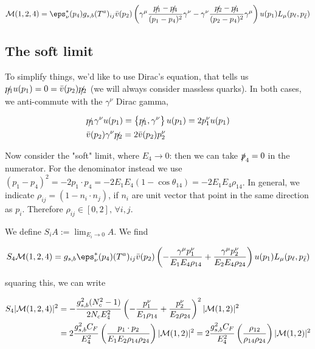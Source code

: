 \documentclass[11pt]{report}
\begin{document}
\begin{align}
    \label{eq:NLOme}
    \mathcal{M}(1, 2, 4) = \eps^*_\nu(p_4)g_{s, b}(T^a)_{ij}\bar{v}(p_2)\left( \gamma^\mu\frac{\slashed{p_1}-\slashed{p_4}}{(p_1-p_4)^2}\gamma^\nu - \gamma^\nu \frac{ \slashed{p_2}-\slashed{p_4}}{(p_2-p_4)^2}\gamma^\mu\right) u(p_1)L_\mu (p_\ell, p_{\bar{\ell}})
\end{align}

\subsection{The soft limit}

To simplify things, we'd like to use Dirac's equation, that tells us \(\slashed{p_1}u(p_1) = 0 = \bar{v}(p_2)\slashed{p_2}\) (we will always consider massless quarks). In both cases, we anti-commute with the \(\gamma^\nu\) Dirac gamma, 

\begin{align}
    &\slashed{p_1}\gamma^\nu u(p_1) = \left\{ \slashed{p_1}, \gamma^\nu \right\} u(p_1) = 2p_1^\nu u(p_1) \notag \\ 
    &\bar{v}(p_2)\gamma^\nu\slashed{p_2} = 2\bar{v}(p_2)p_2^\nu 
\end{align}

Now consider the "soft" limit, where \(E_4 \to 0\): then we can take \(\slashed{p}_4 = 0\) in the numerator. For the denominator instead we use \((p_1-p_4)^2 = -2p_1 \cdot p_4 = -2E_1 E_4 (1-\cos\theta_{14}) = -2E_1 E_4 \rho_{14}\). In general, we indicate \(\rho_{ij} = (1 - n_i \cdot n_j)\), if \(n_i\) are unit vector that point in the same direction as \(p_i\). Therefore \(\rho_{ij} \in [0, 2], \, \forall i, j\).   

We define \(S_i A := \lim_{E_i \to 0}A\). We find 

\begin{align}
    S_4 \mathcal{M}(1, 2, 4) = g_{s, b}\eps^*_\nu (p_4) (T^a)_{ij} \bar{v}(p_2)\left( -\frac{\gamma^\mu p_1^\nu}{E_1 E_4\rho_{14}}  + \frac{\gamma^\mu p_2^\nu}{E_2 E_4\rho_{24}}\right)u(p_1)L_\mu (p_\ell, p_{\bar{\ell}})
\end{align}

squaring this, we can write 

\begin{align}
    \label{eq:softDYfactorization}
    S_4 |\mathcal{M}(1, 2,4)|^2 &= -\frac{g_{s, b}^2 (N_c^2-1)}{2N_c E_4^2} \left(-\frac{p_1^\nu}{E_1 \rho_{14}}  +\frac{p_2^\nu}{E_2\rho_{24}}\right)^2|\mathcal{M}(1, 2)|^2 \notag \\ 
    &= 2\frac{g_{s, b}^2 C_F}{E_4^2}\left( \frac{p_1\cdot p_2}{E_1E_2 \rho_{14}\rho_{24}} \right)|\mathcal{M}(1, 2)|^2 = 2\frac{g_{s, b}^2 C_F}{E_4^2}\left( \frac{\rho_{12}}{\rho_{14}\rho_{24}} \right)|\mathcal{M}(1, 2)|^2
\end{align}
\end{document}
